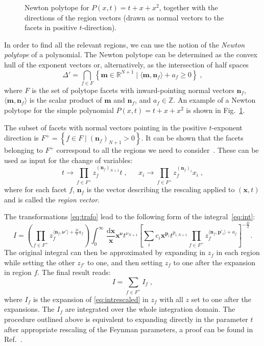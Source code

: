 \documentclass[Physsubmission, Phys]{SciPost}
\newcommand*{\fig}[1]{{}}
\def\be{\begin{equation}}
\def\ee{\end{equation}}
\begin{document}
\begin{figure}[h]
    \centering
    \fig{polytope1.tikz}
    \caption{Newton polytope for $P(x,t) = t+x+x^2$, together with the directions of the region vectors (drawn as normal vectors to the facets in positive $t$-direction).}
    \label{fig:polytope_simple}
\end{figure}

\noindent In order to find all the relevant regions, we can use the notion of the {\em Newton polytope} of a polynomial.
The Newton polytope can be determined as the convex hull of the exponent vectors or, alternatively, as the intersection of half spaces
\begin{equation}
\Delta' = \bigcap_{f\in F} \left\{ \mathbf{m}\in\mathbb{R}^{N+1} \mid \langle \mathbf{m},\mathbf{n}_f\rangle + a_f \geq 0 \right\}\;,
\end{equation}
where $F$ is the set of polytope facets with inward-pointing normal vectors $\mathbf{n}_f$, $\langle \mathbf{m},\mathbf{n}_f\rangle$ is the scalar product of $\mathbf{m}$ and $\mathbf{n}_f$, and $a_f\in \mathbb{Z}$.
An example of a Newton polytope for the  simple polynomial $ P(x,t) = t+x+x^2 $ is shown in Fig.~\ref{fig:polytope_simple}.

The subset of facets with normal vectors pointing in the positive $t$-exponent direction is $F^+ = \left\{ f \in F \mid (\mathbf{n}_f)_{N+1} > 0\right\}$. It can be shown that the facets belonging to $F^+$ correspond to all the regions we need to consider~\cite{Pak:2010pt}. These can be used as input for the change of variables:
\be
t \rightarrow \prod_{f \in F^+} z_f^{(\mathbf{n}_f)_{N+1}} t\;,~~~~~~~
x_i \rightarrow  \prod_{f \in F^+} z_f^{(\mathbf{n}_f)_i} x_i\;,
\label{eq:trafo}
\ee
where for each facet $f$, $\mathbf{n}_f$ is the vector describing the rescaling applied to $(\mathbf{x},t)$ and is called the {\em region vector}.

The transformations \eqref{eq:trafo} lead to the following form of the integral~\eqref{eq:int}:
\be
I = \left(\prod_{f\in F^+} z_f^{\langle \mathbf{n}_f,\bm{\nu}'\rangle + \frac{D}{2} a_f}\right) \int_0^{\infty}\,\frac{\mathrm{d}\mathbf{x}}{\mathbf{x}} \mathbf{x}^{\bm{\nu}} t^{\nu_{N+1}}  \left[ \sum_i c_i \mathbf{x}^{\mathbf{p}_i} t^{p_{i,N+1}} \prod_{f\in F^+} z_f^{\langle \mathbf{n}_f,\mathbf{p}'_i\rangle + a_f}  \right]^{-\frac{D}{2}}.
\label{eq:intrescaled}
\ee
The original integral can then be approximated by
expanding in $z_f$ in each region while setting the other $z_{f'}$ to one,
and then setting  $z_f$ to one after the expansion in region $f$.
The final result reads:
\be
I = \sum_{f\in F^+} I_f\;,
\label{eq:ebrgen}
\ee
where $I_f$ is the expansion of \eqref{eq:intrescaled} in $z_f$ with all $z$ set to one after the expansions.
The $I_{f}$ are integrated over the whole integration domain.
The procedure outlined above is equivalent to expanding directly in the parameter $t$ after appropriate rescaling of the Feynman parameters, a proof can be found in Ref.~\cite{Heinrich:2021dbf}.
\end{document}
